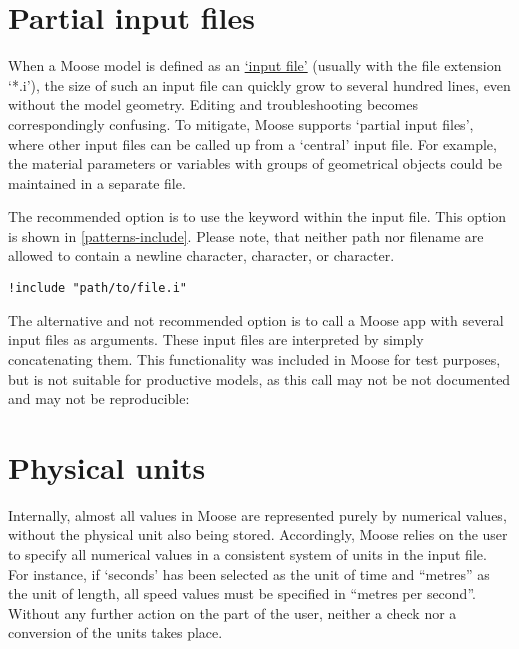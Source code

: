 \section{Partial input files}
\label{chap:patterns-partial-input-files}

When a Moose model is defined as an
\href{https://mooseframework.inl.gov/application_usage/input_syntax.html}{‘input
  file’} (usually with the file extension ‘*.i’), the size of such an input file
can quickly grow to several hundred lines, even without the model geometry.
Editing and troubleshooting becomes correspondingly confusing. To mitigate,
Moose supports ‘partial input files’, where other input files can be called up
from a ‘central’ input file. For example, the material parameters or variables
with groups of geometrical objects could be maintained in a separate file.

The recommended option is to use the  keyword within the
input file. This option is shown in \autoref{patterns-include}. Please note,
that neither path nor filename are allowed to contain a newline character,
\codeword{#} character, or \codeword{[} character.

\begin{lstlisting}[language=Moose, caption={Include another input file},label={patterns-include}]
!include "path/to/file.i"
\end{lstlisting}

The alternative and not recommended option is to call a Moose app with several
input files as arguments. These input files are interpreted by simply
concatenating them. This functionality was included in Moose for test purposes,
but is not suitable for productive models, as this call may not be not
documented and may not be reproducible:


\section{Physical units}
\label{chap:patterns-physical-units}

Internally, almost all values in Moose are represented purely by numerical
values, without the physical unit also being stored. Accordingly, Moose relies
on the user to specify all numerical values in a consistent system of units in
the input file. For instance, if ‘seconds’ has been selected as the unit of
time and “metres” as the unit of length, all speed values must be specified in
“metres per second”. Without any further action on the part of the user,
neither a check nor a conversion of the units takes place.

